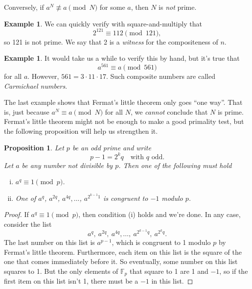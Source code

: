 \documentclass[12pt]{article}
\theoremstyle{plain}
\newtheorem{proposition}[theorem]{Proposition}
\theoremstyle{definition}
\newtheorem{example}[theorem]{Example}
\theoremstyle{remark}
\newcommand{\F}{\mathbb{F}}
\begin{document}
Conversely, if $a^N\not\equiv a \pmod N$ for some $a$, then $N$ is \emph{not} prime.
\begin{example}
    We can quickly verify with square-and-multiply that
    \[
        2^{121} \equiv 112 \pmod{121},
    \]
    so 121 is not prime.
    We say that 2 is a \emph{witness} for the compositeness of $n$.
\end{example}

\begin{example}
    It would take us a while to verify this by hand, but it's true that
    \[
        a^{561} \equiv a \pmod{561}
    \]
    for all $a$.
    However, $561 = 3\cdot 11 \cdot 17$.
    Such composite numbers are called \emph{Carmichael numbers}.
\end{example}

The last example shows that Fermat's little theorem only goes ``one way''.
That is, just because $a^N\equiv a\pmod N$ for all $N$, we \emph{cannot} conclude that $N$ is prime.
Fermat's little theorem might not be enough to make a good primality test, but the following proposition will help us strengthen it.
\begin{proposition}
    Let $p$ be an odd prime and write
    \[
        p-1 = 2^kq\quad\text{with }q\text{ odd.}
    \]
    Let $a$ be any number not divisible by $p$.
    Then one of the following must hold
    \begin{enumerate}[(i)]
        \item $a^q \equiv 1\pmod p$.
        \item One of $a^q$, $a^{2q}$, $a^{4q},\ldots$, $a^{2^{k-1}1}$ is congruent to $-1$ modulo $p$.
    \end{enumerate}
\end{proposition}
\begin{proof}
    If $a^q \equiv 1\pmod p$, then condition (i) holds and we're done.
    In any case, consider the list
    \begin{equation}\label{MR list}
        a^q,\ a^{2q},\ a^{4q},\ldots,\ a^{2^{k-1}q},\ a^{2^kq}.
    \end{equation}
    The last number on this list is $a^{p-1}$, which is congruent to 1 modulo $p$ by Fermat's little theorem.
    Furthermore, each item on this list is the square of the one that comes immediately before it.
    So eventually, some number on this list squares to 1.
    But the only elements of $\F_p$ that square to 1 are 1 and $-1$, so if the first item on this list isn't 1, there must be a $-1$ in this list.
\end{proof}
\end{document}
